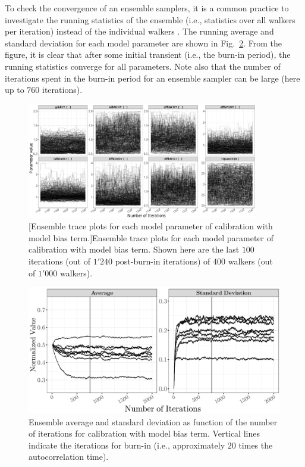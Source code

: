 To check the convergence of an ensemble samplers, it is a common practice to investigate the running statistics of the ensemble (i.e., statistics over all walkers per iteration) instead of the individual walkers \cite{Foreman-Mackey2013,Akeret2013}.
The running average and standard deviation for each model parameter are shown in Fig.~\ref{fig:ch5_plot_ens_stat_mcmc}.
From the figure, it is clear that after some initial transient (i.e., the burn-in period), the running statistics converge for all parameters.
Note also that the number of iterations spent in the burn-in period for an ensemble sampler can be large (here up to $760$ iterations).
\begin{figure}
	\centering
	\includegraphics[width=0.90\textwidth]{../figures/chapter5/figures/plotEnsTraceDiscAllCentered}
		[Ensemble trace plots for each model parameter of calibration with model bias term.]{Ensemble trace plots for each model parameter of calibration with model bias term. Shown here are the last $100$ iterations (out of $1'240$ post-burn-in iterations) of $400$ walkers (out of $1'000$ walkers).}
	\label{fig:ch5_plot_ens_trace_all_disc_centered}
\end{figure}
\clearpage

\begin{figure}[!bth]
    \centering
    \includegraphics[width=1.0\textwidth]{../figures/chapter5/figures/plotEnsStatMCMC}
    \caption[Ensemble average and standard deviation as function of the number of iterations for calibration with model bias term.]{Ensemble average and standard deviation as function of the number of iterations for calibration with model bias term. Vertical lines indicate the iterations for burn-in (i.e., approximately $20$ times the autocorrelation time).}
    \label{fig:ch5_plot_ens_stat_mcmc}
\end{figure}

